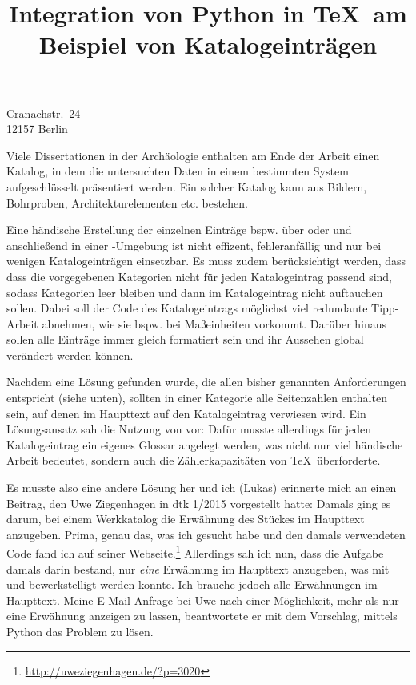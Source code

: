 \documentclass[ngerman]{dtk}
\begin{document}
\title{Integration von Python in \TeX\ am Beispiel von Katalogeinträgen}
%
			{Cranachstr.~24\\
			12157 Berlin\\
			}
\maketitle



Viele Dissertationen in der Archäologie enthalten am Ende der Arbeit einen Katalog, 
in dem die untersuchten Daten in einem bestimmten System aufgeschlüsselt präsentiert werden.
Ein solcher Katalog kann aus  Bildern, Bohrproben, Architekturelementen etc. bestehen.

Eine händische Erstellung der einzelnen Einträge bspw. über  oder  
und anschließend in einer -Umgebung ist nicht effizent, fehleranfällig und nur bei wenigen Katalogeinträgen einsetzbar.
Es muss zudem berücksichtigt werden, dass  dass die vorgegebenen Kategorien nicht für jeden Katalogeintrag passend sind, 
sodass  Kategorien leer bleiben  und dann im Katalogeintrag nicht auftauchen sollen.
Dabei soll der Code des Katalogeintrags möglichst viel redundante Tipp-Arbeit abnehmen, wie sie bspw. bei Maßeinheiten vorkommt.
Darüber hinaus sollen alle Einträge immer gleich formatiert sein und ihr Aussehen global verändert werden können.

Nachdem  eine  Lösung gefunden wurde, die allen bisher genannten Anforderungen entspricht (siehe unten),
sollten in einer Kategorie alle Seitenzahlen enthalten sein, auf denen im Haupttext auf den Katalogeintrag verwiesen wird.
Ein  Lösungsansatz sah die Nutzung von   vor: 
Dafür musste allerdings für jeden Katalogeintrag ein eigenes Glossar angelegt werden, was nicht nur viel händische Arbeit bedeutet,
sondern auch die Zählerkapazitäten von \TeX\ überforderte.

Es musste also eine andere Lösung her und ich (Lukas) erinnerte mich an einen Beitrag, den Uwe Ziegenhagen in dtk 1/2015 vorgestellt hatte:
Damals ging es darum, bei einem Werkkatalog die Erwähnung des Stückes im Haupttext anzugeben. 
Prima, genau das, was ich gesucht habe und den damals verwendeten Code fand  ich auf seiner Webseite.\footnote{\url{http://uweziegenhagen.de/?p=3020}}
Allerdings  sah ich nun, dass die Aufgabe  damals darin bestand, nur \emph{eine} Erwähnung im  Haupttext anzugeben,
was mit  und  bewerkstelligt werden konnte.
Ich brauche jedoch alle Erwähnungen im Haupttext.
Meine E-Mail-Anfrage bei Uwe nach einer Möglichkeit, mehr als nur eine Erwähnung anzeigen zu lassen,
beantwortete er mit dem Vorschlag, mittels Python das Problem zu lösen.
\end{document}
